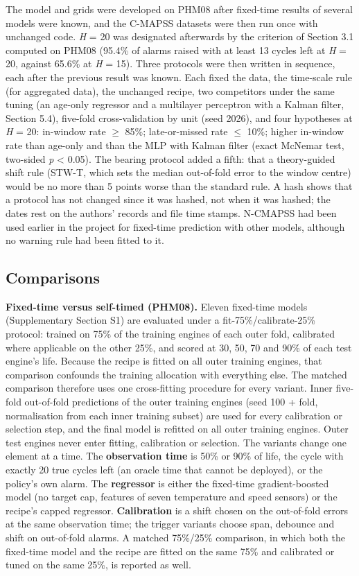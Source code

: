 \documentclass[a4paper,fleqn,doubleblind]{cas-dc}
\begin{document}
The model and grids were developed on PHM08 after fixed-time results of several models were known, and the C-MAPSS datasets were then run once with unchanged code. \textit{H} = 20 was designated afterwards by the criterion of Section 3.1 computed on PHM08 (95.4\% of alarms raised with at least 13 cycles left at \textit{H} = 20, against 65.6\% at \textit{H} = 15). Three protocols were then written in sequence, each after the previous result was known. Each fixed the data, the time-scale rule (for aggregated data), the unchanged recipe, two competitors under the same tuning (an age-only regressor and a multilayer perceptron with a Kalman filter, Section 5.4), five-fold cross-validation by unit (seed 2026), and four hypotheses at \textit{H} = 20: in-window rate $\ge$ 85\%; late-or-missed rate $\le$ 10\%; higher in-window rate than age-only and than the MLP with Kalman filter (exact McNemar test, two-sided \textit{p} < 0.05). The bearing protocol added a fifth: that a theory-guided shift rule (STW-T, which sets the median out-of-fold error to the window centre) would be no more than 5 points worse than the standard rule. A hash shows that a protocol has not changed since it was hashed, not when it was hashed; the dates rest on the authors' records and file time stamps. N-CMAPSS had been used earlier in the project for fixed-time prediction with other models, although no warning rule had been fitted to it.

\subsection{Comparisons}

\textbf{Fixed-time versus self-timed (PHM08).} Eleven fixed-time models (Supplementary Section S1) are evaluated under a fit-75\%/calibrate-25\% protocol: trained on 75\% of the training engines of each outer fold, calibrated where applicable on the other 25\%, and scored at 30, 50, 70 and 90\% of each test engine's life. Because the recipe is fitted on all outer training engines, that comparison confounds the training allocation with everything else. The matched comparison therefore uses one cross-fitting procedure for every variant. Inner five-fold out-of-fold predictions of the outer training engines (seed 100 + fold, normalisation from each inner training subset) are used for every calibration or selection step, and the final model is refitted on all outer training engines. Outer test engines never enter fitting, calibration or selection. The variants change one element at a time. The \textbf{observation time} is 50\% or 90\% of life, the cycle with exactly 20 true cycles left (an oracle time that cannot be deployed), or the policy's own alarm. The \textbf{regressor} is either the fixed-time gradient-boosted model (no target cap, features of seven temperature and speed sensors) or the recipe's capped regressor. \textbf{Calibration} is a shift chosen on the out-of-fold errors at the same observation time; the trigger variants choose span, debounce and shift on out-of-fold alarms. A matched 75\%/25\% comparison, in which both the fixed-time model and the recipe are fitted on the same 75\% and calibrated or tuned on the same 25\%, is reported as well.
\end{document}
